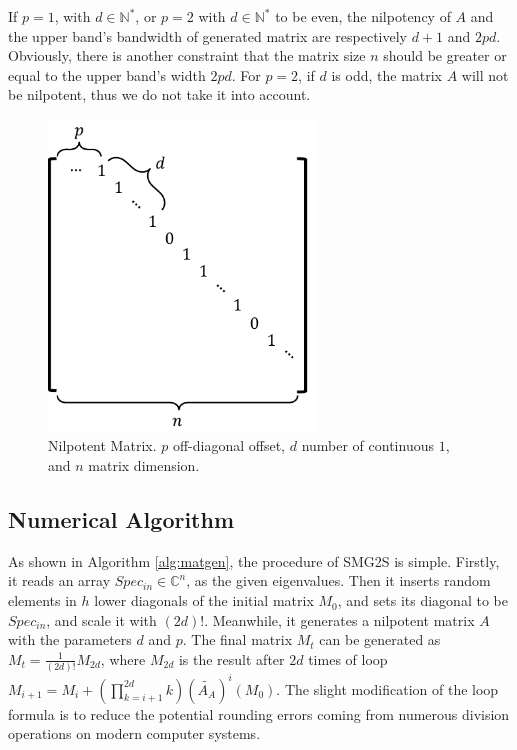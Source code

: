 If $p=1$, with $d \in \mathbb{N^*}$, or $p=2$ with $d \in \mathbb{N^*}$ to be even, the nilpotency of $A$ and the upper band's bandwidth of generated matrix are respectively $d+1$  and $2pd$. Obviously, there is another constraint that the matrix size $n$ should be greater or equal to the upper band's width $2pd$. For $p=2$, if $d$ is odd, the matrix $A$ will not be nilpotent, thus we do not take it into account.

\begin{figure}[htbp]
	\centering
	\includegraphics[width=2.8in]{fig/nilpotent_matrix.pdf}
	\caption{Nilpotent Matrix. $p$ off-diagonal offset, $d$ number of continuous $1$, and $n$ matrix dimension.}
	\label{fig:nilpotent}
\end{figure}

\subsection{Numerical Algorithm}

As shown in Algorithm \ref{alg:matgen}, the procedure of SMG2S is simple. Firstly, it reads an array $Spec_{in} \in \mathbb{C}^{n}$, as the given eigenvalues. Then it inserts random elements in $h$ lower diagonals of the initial matrix $M_0$, and sets its diagonal to be $Spec_{in}$, and scale it with $(2d)!$. Meanwhile, it generates a nilpotent matrix $A$ with the parameters $d$ and $p$. The final matrix $M_t$ can be generated as $M_t=\frac{1}{(2d)!}M_{2d}$, where $M_{2d}$ is the result after $2d$ times of loop $M_{i+1}=M_i+(\prod_{k=i+1}^{2d}k)(\widetilde{A_A})^i(M_0)$. The slight modification of the loop formula is to reduce the potential rounding errors coming from numerous division operations on modern computer systems.

